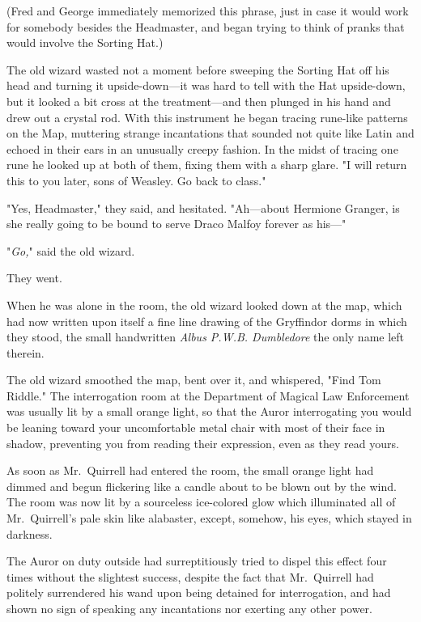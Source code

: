 (Fred and George immediately memorized this phrase, just in case it would work 
for somebody besides the Headmaster, and began trying to think of pranks that 
would involve the Sorting Hat.)

The old wizard wasted not a moment before sweeping the Sorting Hat off his head 
and turning it upside-down---it was hard to tell with the Hat upside-down, but 
it looked a bit cross at the treatment---and then plunged in his hand and drew 
out a crystal rod. With this instrument he began tracing rune-like patterns on 
the Map, muttering strange incantations that sounded not quite like Latin and 
echoed in their ears in an unusually creepy fashion. In the midst of tracing 
one rune he looked up at both of them, fixing them with a sharp glare. "I will 
return this to you later, sons of Weasley. Go back to class."

"Yes, Headmaster," they said, and hesitated. "Ah---about Hermione Granger, is 
she really going to be bound to serve Draco Malfoy forever as his---"

"\emph{Go,}" said the old wizard.

They went.

When he was alone in the room, the old wizard looked down at the map, which had 
now written upon itself a fine line drawing of the Gryffindor dorms in which 
they stood, the small handwritten \emph{Albus P.W.B. Dumbledore} the only name 
left therein.

The old wizard smoothed the map, bent over it, and whispered, "Find Tom Riddle."
\sbreak
The interrogation room at the Department of Magical Law Enforcement was usually 
lit by a small orange light, so that the Auror interrogating you would be 
leaning toward your uncomfortable metal chair with most of their face in 
shadow, preventing you from reading their expression, even as they read yours.

As soon as Mr.~Quirrell had entered the room, the small orange light had dimmed 
and begun flickering like a candle about to be blown out by the wind. The room 
was now lit by a sourceless ice-colored glow which illuminated all of 
Mr.~Quirrell's pale skin like alabaster, except, somehow, his eyes, which 
stayed in darkness.

The Auror on duty outside had surreptitiously tried to dispel this effect four 
times without the slightest success, despite the fact that Mr.~Quirrell had 
politely surrendered his wand upon being detained for interrogation, and had 
shown no sign of speaking any incantations nor exerting any other power.

